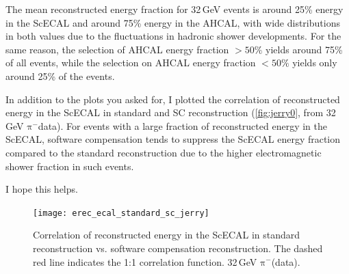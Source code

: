 \documentclass[twoside,a4paper,12pt]{article}
\newcommand\piminus{\(\mathrm{\pi^-}\)}
\begin{document}
The mean reconstructed energy fraction for 32\,GeV events is around 25\% energy in the ScECAL and around 75\% energy in the AHCAL, with wide distributions in both values due to the fluctuations in hadronic shower developments. For the same reason, the selection of AHCAL energy fraction $>50\%$ yields around 75\% of all events, while the selection on AHCAL energy fraction $<50\%$ yields only around 25\% of the events.

In addition to the plots you asked for, I plotted the correlation of reconstructed energy in the ScECAL in standard and SC reconstruction (\autoref{fig:jerry0}, from 32\,GeV \piminus data). For events with a large fraction of reconstructed energy in the ScECAL, software compensation tends to suppress the ScECAL energy fraction compared to the standard reconstruction due to the higher electromagnetic shower fraction in such events. 

I hope this helps.


\begin{figure}[hbt]
\begin{center}
\texttt{[image: erec\_ecal\_standard\_sc\_jerry]}
\caption{Correlation of reconstructed energy in the ScECAL in standard reconstruction vs. software compensation reconstruction. The dashed red line indicates the 1:1 correlation function. 32\,GeV \piminus (data).}
\label{fig:jerry0}
\end{center}
\end{figure}
\end{document}
